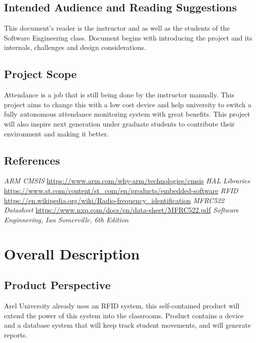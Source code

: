 \documentclass{scrreprt}
\begin{document}
\section{Intended Audience and Reading Suggestions}
This document's reader is the instructor and as well as the students of the Software Engineering class. Document begins with introducing the project and its internals, challenges and design considerations. 

\section{Project Scope}

Attendance is a job that is still being done by the instructor manually. This project aims to change this with a low cost device and help university to switch a fully autonomous attendance monitoring system with great benefits. This project will also inspire next generation under graduate students to contribute their environment and making it better.

\section{References}

\textit{ARM CMSIS}  \url{https://www.arm.com/why-arm/technologies/cmsis}
\newline
\textit{HAL Libraries} \url{https://www.st.com/content/st_com/en/products/embedded-software}
\newline
\textit{RFID} \url{https://en.wikipedia.org/wiki/Radio-frequency_identification}
\newline
\textit{MFRC522 Datasheet} \url{https://www.nxp.com/docs/en/data-sheet/MFRC522.pdf}
\newline
\textit{Software Enginnering, Ian Somerville, 6th Edition}


{\let\clearpage\relax\chapter{Overall Description}}

\section{Product Perspective}
Arel University already uses an RFID system, this self-contained product will extend the power of this system into the classrooms. Product contains a device and a database system that will keep track student movements, and will generate reports.
\end{document}
